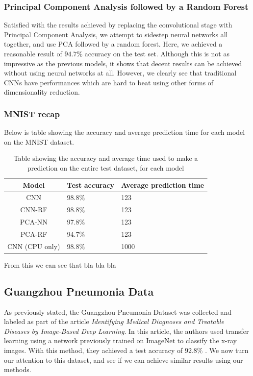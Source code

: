 \documentclass[onecolumn,10pt,cleanfoot]{asme2ej}
\begin{document}
\subsubsection{Principal Component Analysis followed by a Random Forest}

Satisfied with the results achieved by replacing the convolutional stage with Principal Component Analysis, we attempt to sidestep neural networks all together, and use PCA followed by a random forest. Here, we achieved a reasonable result of $94.7\%$ accuracy on the test set. Although this is not as impressive as the previous models, it shows that decent results can be achieved without using neural networks at all. However, we clearly see that traditional CNNs have performances which are hard to beat using other forms of dimensionality reduction.

\subsubsection{MNIST recap}

Below is table showing the accuracy and average prediction time for each model on the MNIST dataset.

\begin{table}[H]
\caption{Table showing the accuracy and average time used to make a prediction on the entire test dataset, for each model}
\begin{center}
\label{pcanntable}
\begin{tabular}{| c | l | l |}
\hline
Model & Test accuracy & Average prediction time \\
\hline
CNN & 98.8\% & 123 \\
CNN-RF & 98.8\% & 123 \\
PCA-NN & 97.8\% & 123 \\
PCA-RF & 94.7\% & 123 \\
CNN (CPU only) & 98.8\% & 1000 \\
\hline
\end{tabular}
\end{center}
\end{table}

From this we can see that bla bla bla

\subsection{Guangzhou Pneumonia Data}

As previously stated, the Guangzhou Pneumonia Dataset was collected and labeled as part of the article {\it Identifying Medical Diagnoses and Treatable Diseases by Image-Based Deep Learning}. In this article, the authors used transfer learning using a network previously trained on ImageNet to classify the x-ray images. With this method, they achieved a test accuracy of $92.8\%$ \cite[1127]{xray}. We now turn our attention to this dataset, and see if we can achieve similar results using our methods.
\end{document}
